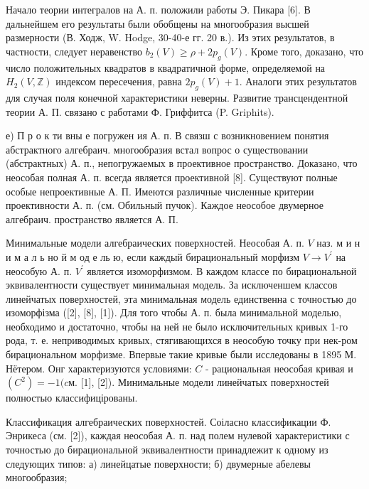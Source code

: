 \documentclass[10pt]{article}
\begin{document}
Начало теории интегралов на А. п. положили работы Э. Пикара [6]. В дальнейшем его результаты были обобщены на многообразия высшей размерности (В. Ходж, W. Hodge, 30-40-е гг. 20 в.). Из этих результатов, в частности, следует неравенство $b_{2}(V) \geqslant \rho+2 p_{g}(V)$. Кроме того, доказано, что число положительных квадратов в квадратичной форме, определяемой на $H_{2}(V, \mathbb{Z})$ индексом пересечения, равна $2 p_{g}(V)+1$. Аналоги этих результатов для случая поля конечной характеристики неверны. Развитие трансцендентной теории А. П. связано с работами Ф. Гриффитса (P. Griphits).



е) П р о к ти вны е погружен ия А. п. В связш с возникновением понятия абстрактного алгебраич. многообразия встал вопрос о существовании (абстрактных) А. п., непогружаемых в проективное пространство. Доказано, что неособая полная А. п. всегда является проективной [8]. Существуют полные особые непроективные А. П. Имеются различные численные критерии проективности А. п. (см. Обильный пучок). Каждое неособое двумерное алгебраич. пространство является А. П.



Минимальные модели алгебраических поверхностей. Неособая А. п. $V$ наз. м и н и м а л ь но й м од е ль ю, если каждый бирациональный морфизм $V \rightarrow V^{\prime}$ на неособую А. п. $V^{\prime}$ является изоморфизмом. В каждом классе по бирациональной эквивалентности существует минимальная модель. За исключеншем классов линейчатых поверхностей, эта минимальная модель единственна с точностью до изоморфізма ([2], [8], [1]). Для того чтобы А. п. была минимальной моделью, необходимо и достаточно, чтобы на ней не было исключительных кривых 1-го рода, т. е. неприводимых кривых, стягивающихся в неособую точку при нек-ром бирациональном морфизме. Впервые такие кривые были исследованы в 1895 М. Нётером. Онг характеризуются условиями: $C$ - рациональная неособая кривая и $\left(C^{2}\right)=-1(c м$. [1], [2]). Минимальные модели линейчатых поверхностей полностью классифицірованы.



Классификация алгебраических поверхностей. Соіласно классификации Ф. Энрикеса (см. [2]), каждая неособая А. п. над полем нулевой характеристики с точностью до бирациональной эквивалентности принадлежит к одному из следующих типов: а) линейцатые поверхности; б) двумерные абелевы многообразия;
\end{document}
